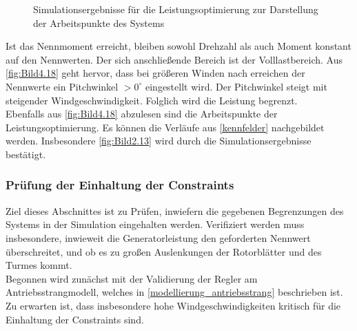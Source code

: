 \begin{figure}[H]
   \centering
   \caption[Simulation der Leistungsoptimierung]{Simulationsergebnisse für die Leistungsoptimierung zur Darstellung der Arbeitspunkte des Systems}
   \label{fig:Bild4.18}
\end{figure}

Ist das Nennmoment erreicht, bleiben sowohl Drehzahl als auch Moment konstant auf den Nennwerten. Der sich anschließende Bereich ist der Volllastbereich. Aus \autoref{fig:Bild4.18} geht hervor, dass bei größeren Winden nach erreichen der Nennwerte ein Pitchwinkel $>0^\circ$ eingestellt wird. Der Pitchwinkel steigt mit steigender Windgeschwindigkeit. Folglich wird die Leistung begrenzt.\\
Ebenfalls aus \autoref{fig:Bild4.18} abzulesen sind die Arbeitspunkte der Leistungsoptimierung. Es können die Verläufe aus \autoref{kennfelder} nachgebildet werden. Insbesondere \autoref{fig:Bild2.13} wird durch die Simulationsergebnisse bestätigt.

\subsubsection{Prüfung der Einhaltung der Constraints}

Ziel dieses Abschnittes ist zu Prüfen, inwiefern die gegebenen Begrenzungen des Systems in der Simulation eingehalten werden. Verifiziert werden muss insbesondere, inwieweit die Generatorleistung den geforderten Nennwert überschreitet, und ob es zu großen Auslenkungen der Rotorblätter und des Turmes kommt.\\
Begonnen wird zunächst mit der Validierung der Regler am Antriebsstrangmodell, welches in \autoref{modellierung_antriebsstrang} beschrieben ist. Zu erwarten ist, dass insbesondere hohe Windgeschwindigkeiten kritisch für die Einhaltung der Constraints sind.

